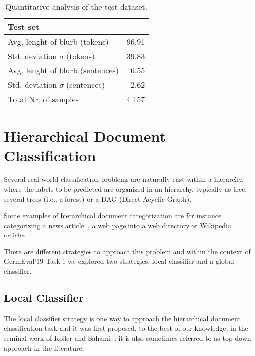\documentclass[11pt,a4paper]{article}
\begin{document}
\begin{table}
\small
\begin{center}
\begin{tabular}{|l|r|}
\hline\centering\textbf{Test set}  &         \\
\hline
Avg. lenght of blurb (tokens)              &  96.91             \\
Std. deviation $\sigma$ (tokens)           &  39.83             \\
Avg. lenght of blurb (sentences)           &  6.55              \\
Std. deviation $\sigma$ (sentences)        &  2.62              \\
\hline
Total Nr. of samples                       &  4 157             \\
\hline
\end{tabular}
\end{center}
\caption{\label{quantitivy-analysis-test}Quantitative analysis of the test dataset.}
\end{table}

\section{Hierarchical Document Classification}\label{hierarchical-clf}

Several real-world classification problems are naturally cast within a hierarchy,
where the labels to be predicted are organized in an hierarchy, typically as
tree, several trees (i.e., a forest) or a DAG (Direct Acyclic Graph).

Some examples of hierarchical document categorization are for instance categorizing
a news article~\cite{Lewis:2004:RNB:1005332.1005345}, a web page into a web
directory or Wikipedia articles~\cite{PartalasKBAPGAA15}.

There are different strategies to approach this problem and within the context
of GermEval'19 Task 1 we explored two strategies: local classifier and a
global classifier.


\subsection{Local Classifier}

The local classifier strategy is one way to approach the hierarchical document classification task
and it was first proposed, to the best of our knowledge, in the seminal work of Koller and
Sahami~, it is also sometimes referred to as top-down
approach in the literature.
\end{document}
